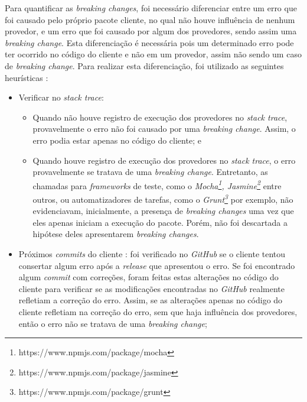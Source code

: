 Para quantificar as \textit{breaking changes}, foi necessário diferenciar entre um erro que foi causado pelo próprio pacote cliente, no qual não houve influência de nenhum provedor, e um erro que foi causado por algum dos provedores, sendo assim uma \textit{breaking change}. Esta diferenciação é necessária pois um determinado erro pode ter ocorrido no código do cliente e não em um provedor, assim não sendo um caso de \textit{breaking change}. Para realizar esta diferenciação, foi utilizado  as seguintes heurísticas :

\begin{itemize}
    \item Verificar no \textit{stack trace}: 
    \begin{itemize}
        \item Quando não houve registro de execução dos provedores  no \textit{stack trace}, provavelmente  o erro não foi causado por uma \textit{breaking change}. Assim, o erro podia estar apenas no código do cliente; e
        \item Quando houve registro de execução dos provedores  no \textit{stack trace}, o erro provavelmente se tratava de uma \textit{breaking change}. Entretanto, as chamadas para \textit{frameworks} de teste, como o \textit{Mocha\footnote{https://www.npmjs.com/package/mocha}, Jasmine\footnote{https://www.npmjs.com/package/jasmine}} entre outros, ou automatizadores de tarefas, como o \textit{Grunt\footnote{https://www.npmjs.com/package/grunt}} por exemplo, não evidenciavam, inicialmente, a presença de \textit{breaking changes} uma vez que eles apenas iniciam a execução do pacote.  Porém, não foi descartada a hipótese deles apresentarem \textit{breaking changes}.
    \end{itemize}{}

    \item Próximos \textit{commits} do cliente : foi verificado no \textit{GitHub} se o cliente tentou consertar algum erro após a \textit{release} que apresentou o erro. Se foi encontrado algum \textit{commit} com correções, foram feitas estas alterações no código do cliente para verificar se as modificações encontradas no \textit{GitHub} realmente refletiam a correção do erro. Assim, se as alterações apenas no código do cliente refletiam na correção do erro, sem que haja influência dos provedores, então o erro não se tratava de uma \textit{breaking change};


\end{itemize}
